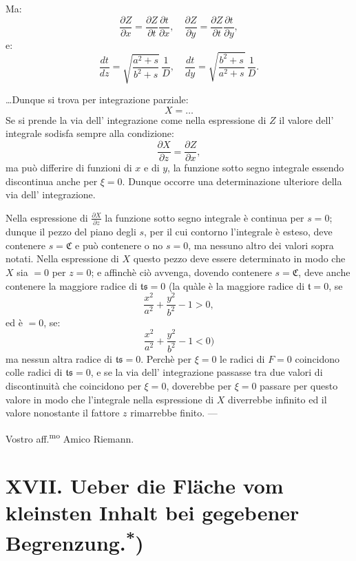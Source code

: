 \documentclass[12pt,a4paper]{article}
\begin{document}
Ma:
\[\frac{\partial Z}{\partial x} = \frac{\partial Z}{\partial t} \frac{\partial t}{\partial x}, \quad \frac{\partial Z}{\partial y} = \frac{\partial Z}{\partial t} \frac{\partial t}{\partial y},\]
e:
\[\frac{dt}{dz} = \sqrt{\frac{a^{2}+s}{b^{2}+s}} \, \frac{1}{D}, \quad \frac{dt}{dy} = \sqrt{\frac{b^{2}+s}{a^{2}+s}} \, \frac{1}{D}.\]

\dots Dunque si trova per integrazione parziale:
\[X = \dots\]
Se si prende la via dell' integrazione come nella espressione di $Z$ il valore dell' integrale sodisfa sempre alla condizione:
\[\frac{\partial X}{\partial z} = \frac{\partial Z}{\partial x},\]
ma pu\`o differire di funzioni di $x$ e di $y$, la funzione sotto segno integrale essendo discontinua anche per $\xi = 0$. Dunque occorre una determinazione ulteriore della via dell' integrazione.

Nella espressione di $\frac{\partial X}{\partial z}$ la funzione sotto segno integrale \`e continua per $s=0$; dunque il pezzo del piano degli $s$, per il cui contorno l'integrale \`e esteso, deve contenere $s = \mathfrak{C}$ e pu\`o contenere o no $s = 0$, ma nessuno altro dei valori sopra notati. Nella espressione di $X$ questo pezzo deve essere determinato in modo che $X$ sia $=0$ per $z=0$; e affinch\`e ci\`o avvenga, dovendo contenere $s = \mathfrak{C}$, deve anche contenere la maggiore radice di $\mathfrak{ts}=0$ (la qu\`ale \`e la maggiore radice di $\mathfrak{t}=0$, se
\[\frac{x^{2}}{a^{2}} + \frac{y^{2}}{b^{2}} - 1 > 0,\]
ed \`e $=0$, se:
\[\frac{x^{2}}{a^{2}} + \frac{y^{2}}{b^{2}} - 1 < 0)\]
ma nessun altra radice di $\mathfrak{ts}=0$. Perch\`e per $\xi=0$ le radici di $F=0$ coincidono colle radici di $\mathfrak{ts}=0$, e se la via dell' integrazione passasse tra due valori di discontinuit\`a che coincidono per $\xi=0$, doverebbe per $\xi=0$ passare per questo valore in modo che l'integrale nella espressione di $X$ diverrebbe infinito ed il valore nonostante il fattore $z$ rimarrebbe finito. ---

Vostro aff.\textsuperscript{mo} Amico Riemann.

\newpage
\section*{XVII. Ueber die Fl\"ache vom kleinsten Inhalt bei gegebener Begrenzung.\textsuperscript{*})}
\end{document}
